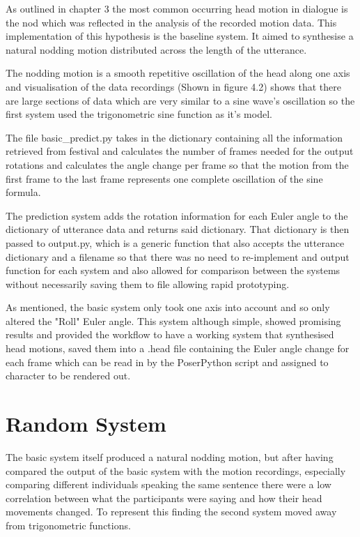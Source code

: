 \documentclass[bsc,frontabs,twoside,singlespacing,parskip]{infthesis}
\begin{document}
As outlined in chapter 3 the most common occurring head motion in dialogue is the nod which was reflected in the analysis of the recorded motion data. This implementation of this hypothesis is the baseline system. It aimed to synthesise a natural nodding motion distributed across the length of the utterance.

The nodding motion is a smooth repetitive oscillation of the head along one axis and visualisation of the data recordings (Shown in figure 4.2) shows that there are large sections of data which are very similar to a sine wave's oscillation so the first system used the trigonometric sine function as it's model.

The file basic\_predict.py takes in the dictionary containing all the information retrieved from festival and calculates the number of frames needed for the output rotations and calculates the angle change per frame so that the motion from the first frame to the last frame represents one complete oscillation of the sine formula.

The prediction system adds the rotation information for each Euler angle to the dictionary of utterance data and returns said dictionary. That dictionary is then passed to output.py, which is a generic function that also accepts the utterance dictionary and a filename so that there was no need to re-implement and output function for each system and also allowed for comparison between the systems without necessarily saving them to file allowing rapid prototyping.

As mentioned, the basic system only took one axis into account and so only altered the "Roll" Euler angle. This system although simple, showed promising results and provided the workflow to have a working system that synthesised head motions, saved them into a .head file containing the Euler angle change for each frame which can be read in by the PoserPython script and assigned to character to be rendered out.

\section{Random System}

The basic system itself produced a natural nodding motion, but after having compared the output of the basic system with the motion recordings, especially comparing different individuals speaking the same sentence there were a low correlation between what the participants were saying and how their head movements changed. To represent this finding the second system moved away from trigonometric functions.
\end{document}
